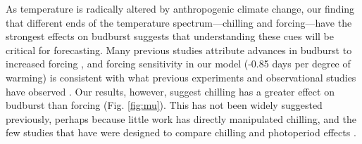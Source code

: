 \documentclass{article}
\begin{document}

\par As temperature is radically altered by anthropogenic climate change, our finding that different ends of the temperature spectrum---chilling and forcing---have the strongest effects on budburst suggests that understanding these cues will be critical for forecasting. Many previous studies attribute advances in budburst to increased forcing \citep{Basler:2014aa,bradley1999,menzel2006,harrington2015}, and forcing sensitivity in our model (-0.85 days per degree of warming) is consistent with what previous experiments and observational studies have observed \citep{wolkovich2012,menzel2006}. Our results, however, suggest chilling has a greater effect on budburst than forcing (Fig. \ref{fig:mu}). This has not been widely suggested previously, perhaps because little work has directly manipulated chilling, and the few studies that have were designed to compare chilling and photoperiod effects \citep[e.g., ][]{Basler:2014aa,Caffarra:2011qf,Laube:2014a,zohner2016}. 
\end{document}
